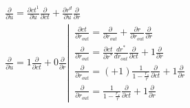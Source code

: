 \begin{equation}
    \begin{array}{l}
        \frac{\partial}{\partial u}=\frac{\partial c t^1}{\partial u} \frac{\partial}{\partial c t}+\frac{\partial r^d}{\partial u} \frac{\partial}{\partial r} \\
        \frac{\partial}{\partial u}=1 \frac{\partial}{\partial c t}+0 \frac{\partial}{\partial r} \left\lvert\, \begin{array}{l}
                                                                                                                    \frac{\partial c t}{\partial r_{o u t}}=\frac{\partial}{\partial r_{o u t}}+\frac{\partial r}{\partial r_{o u t}} \frac{\partial}{\partial r}               \\
                                                                                                                    \frac{\partial}{\partial r_{o u t}}=\frac{\partial c t}{\partial r^*} \frac{d r^*}{d r_{o u t}} \frac{\partial}{\partial c t}+1 \frac{\partial}{\partial r} \\
                                                                                                                    \frac{\partial}{\partial r_{o u t}}=(+1) \frac{1}{1-\frac{r_s}{r}} \frac{\partial}{\partial c t}+1 \frac{\partial}{\partial r}                              \\
                                                                                                                    \frac{\partial}{\partial r_{o u t}}=\frac{1}{1-\frac{r_s}{r}} \frac{\partial}{\partial c t}+1 \frac{\partial}{\partial r}
                                                                                                                \end{array}\right.
    \end{array}
\end{equation}

